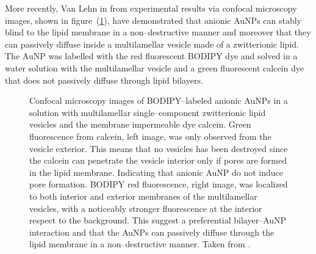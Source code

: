More recently, Van Lehn \etal in \cite{VanLehn2013} from experimental results via confocal microscopy images, shown in figure~(\ref{fig:fluorescent}), have demonstrated that anionic \acp{AuNP} can stably blind to the lipid membrane in a non--destructive manner and moreover that they can passively diffuse inside a multilamellar vesicle made of a zwitterionic lipid. The \ac{AuNP} was labelled with the red fluorescent BODIPY dye and solved in a water solution with the multilamellar vesicle and a green fluorescent calcein dye that does not passively diffuse through lipid bilayers.
\begin{figure}[!ht]
	\centering
	\qquad\qquad\qquad%
	\caption{Confocal microscopy images of BODIPY--labeled anionic \acp{AuNP} in a solution with multilamellar single--component zwitterionic lipid vesicles and the membrane impermeable dye calcein. Green fluorescence from calcein, left image, was only observed from the vesicle exterior. This means that no vesicles has been destroyed since the calcein can penetrate the vesicle interior only if pores are formed in the lipid membrane. Indicating that anionic \acs{AuNP} do not induce pore formation. BODIPY red fluorescence, right image, was localized to both interior and exterior membranes of the multilamellar vesicles, with a noticeably stronger fluorescence at the interior respect to the background. This suggest a preferential bilayer--\acs{AuNP} interaction and that the \acp{AuNP} can passively diffuse through the lipid membrane in a non--destructive manner. Taken from \cite{VanLehn2013}.}%
	\label{fig:fluorescent}
\end{figure}

